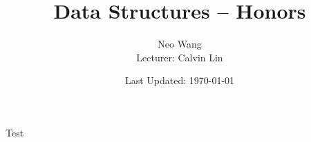 \documentclass{scrreprt}
\title{Data Structures -- Honors}
\author{Neo Wang\\ Lecturer: Calvin Lin}
\date{Last Updated: \today}
\begin{document}
\maketitle

\begin{markdown}
Test
\end{markdown}
\end{document}
